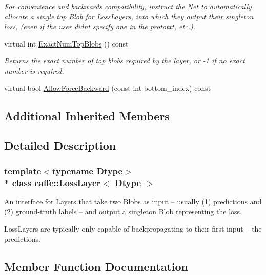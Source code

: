 \begin{DoxyCompactItemize}
\begin{DoxyCompactList}\small\item\em For convenience and backwards compatibility, instruct the \hyperlink{classcaffe_1_1Net}{Net} to automatically allocate a single top \hyperlink{classcaffe_1_1Blob}{Blob} for Loss\+Layers, into which they output their singleton loss, (even if the user didn\textquotesingle{}t specify one in the prototxt, etc.). \end{DoxyCompactList}\item 
virtual int \hyperlink{classcaffe_1_1LossLayer_af8dca16967e8e979ebead4e80664dc10}{Exact\+Num\+Top\+Blobs} () const 
\begin{DoxyCompactList}\small\item\em Returns the exact number of top blobs required by the layer, or -\/1 if no exact number is required. \end{DoxyCompactList}\item 
virtual bool \hyperlink{classcaffe_1_1LossLayer_ad02fe695b06451ac8e6f21db0cba1dad}{Allow\+Force\+Backward} (const int bottom\+\_\+index) const 
\end{DoxyCompactItemize}
\subsection*{Additional Inherited Members}


\subsection{Detailed Description}
\subsubsection*{template$<$typename Dtype$>$\\*
class caffe\+::\+Loss\+Layer$<$ Dtype $>$}

An interface for \hyperlink{classcaffe_1_1Layer}{Layer}s that take two \hyperlink{classcaffe_1_1Blob}{Blob}s as input -- usually (1) predictions and (2) ground-\/truth labels -- and output a singleton \hyperlink{classcaffe_1_1Blob}{Blob} representing the loss. 

Loss\+Layers are typically only capable of backpropagating to their first input -- the predictions. 

\subsection{Member Function Documentation}
